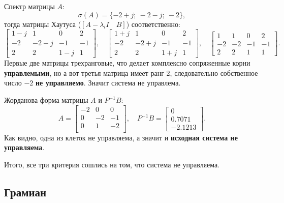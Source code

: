 Спектр матрицы $A$:
$$\sigma(A)=\{ -2 + j;\ -2-j;\ -2\},$$
тогда матрицы Хаутуса ($[A-\lambda_iI\quad B]$) соответственно:
\begin{equation*}
    \begin{bmatrix}
        1-j&1&0&2\\
        -2&-2-j&-1&-1\\
        2&2&1-j&1
    \end{bmatrix},\quad 
    \begin{bmatrix}
        1+j&1&0&2\\-2&-2+j&-1&-1\\2&2&1+j&1
    \end{bmatrix},\quad
    \begin{bmatrix}
        1 & 1 & 0 & 2 \\
        -2 & -2 & -1 & -1 \\
        2 & 2 & 1 & 1
    \end{bmatrix}.
\end{equation*}
Первые две матрицы трехранговые, что делает комплексно сопряженные корни
\textbf{управлемыми}, но а вот третья матрица имеет ранг 2, следовательно собственное
число $-2$ \textbf{не управляемо}. Значит система не управлема.

Жорданова форма матрицы $A$ и $P^{-1}B$:
\begin{equation*}
    A =\begin{bmatrix}
        
-2&	   0&	   0\\
0&	  -2&	   -1\\
0&	   1&	  -2\\

    \end{bmatrix},\quad
    P^{-1}B=\begin{bmatrix}
        0 \\ 0.7071 \\ -2.1213
    \end{bmatrix}.
\end{equation*}
Как видно, одна из клеток не управляема, а значит и \textbf{исходная система
не управляема}.

Итого, все три критерия сошлись на том, что система не управляема.

\subsection{Грамиан}

